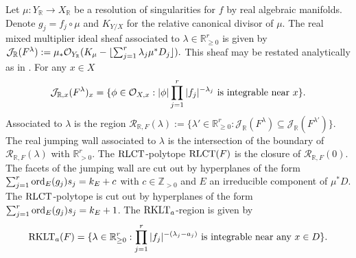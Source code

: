 Let $\mu:Y_\mathbb{R}\to X_\mathbb{R}$ be a resolution of singularities for $f$ by real algebraic manifolds.
Denote $g_j = f_j\circ \mu$ and $K_{Y/X}$ for the relative canonical divisor of $\mu$.
The real mixed multiplier ideal sheaf associated to $\lambda \in \mathbb{R}_{\geq 0}^r$ is given by
$\mathcal{J}_{\mathbb{R}}(F^\lambda) := \mu_* \mathcal{O}_{Y_\mathbb{R}}(K_\mu - \lfloor \sum_{j=1}^r \lambda_j \mu^* D_j \rfloor). $
This sheaf may be restated analytically as in \cite[Proposition 1]{RealLogCan}.
For any $x\in X$
$$\mathcal{J}_{\mathbb{R},x}(F^\lambda)_x =\{\phi\in \mathcal{O}_{X,x} :  \vert \phi \vert\prod_{j=1}^r \vert f_j \vert^{-\lambda_j} \text{ is integrable near }x\}.$$
Associated to $\lambda$ is the region $\mathcal{R}_{\mathbb{R},F}(\lambda) := \{\lambda' \in \mathbb{R}_{\geq 0}^r : \mathcal{J}_\mathbb{R}(F^\lambda) \subseteq \mathcal{J}_\mathbb{R}(F^{\lambda'})\}.$
The real jumping wall associated to $\lambda$ is the intersection of the boundary of $\mathcal{R}_{\mathbb{R},F}(\lambda)$ with $\mathbb{R}_{>0}^r$. The $\operatorname{RLCT}$-polytope $\operatorname{RLCT}(F)$ is the closure of $\mathcal{R}_{\mathbb{R},F}(0)$.
The facets of the jumping wall are cut out by hyperplanes of the form $\sum_{j=1}^r\operatorname{ord}_E(g_j)s_j = k_E + c$ with $c\in \mathbb{Z}_{>0}$ and $E$ an irreducible component of $\mu^*D$.
The $\operatorname{RLCT}$-polytope is cut out by hyperplanes of the form $\sum_{j=1}^r\operatorname{ord}_E(g_j)s_j = k_E + 1$.
The $\operatorname{RKLT}_a$-region is given by
$$\operatorname{RKLT}_a(F) = \{\lambda\in \mathbb{R}_{\geq 0}^r : \prod_{j=1}^r \vert f_j \vert^{-(\lambda_j-a_j)}\text{ is integrable near any }x\in D\}.$$

